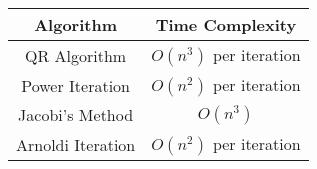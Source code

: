 \begin{tabular}{|c|c|}
        \hline
        \textbf{Algorithm} & \textbf{Time Complexity} \\
        \hline
        QR Algorithm & $O(n^3)$ per iteration \\
        \hline
        Power Iteration & $O(n^2)$ per iteration \\
        \hline
        Jacobi's Method & $O(n^3)$ \\
        \hline
        Arnoldi Iteration & $O(n^2)$ per iteration \\
        \hline
\end{tabular}
